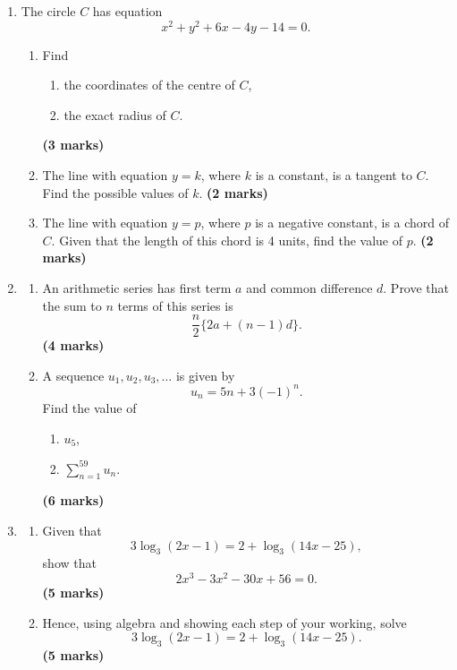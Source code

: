 \documentclass{../Templates/sbs-exam}
\newcommand{\imarks}[1]{\hfill \textbf{(#1 marks)}}
\begin{document}
\begin{enumerate}
\newpage

\item %
The circle $C$ has equation
\[
x^{2}+y^{2}+6x-4y-14=0.
\]
\begin{enumerate}
    \item[(a)] Find
    \begin{enumerate}
        \item[(i)] the coordinates of the centre of $C$,
        \item[(ii)] the exact radius of $C$.
    \end{enumerate} \imarks{3}
    \item[(b)] The line with equation $y=k$, where $k$ is a constant, is a tangent to $C$. Find the possible values of $k$. \imarks{2}
    \item[(c)] The line with equation $y=p$, where $p$ is a negative constant, is a chord of $C$. Given that the length of this chord is 4 units, find the value of $p$. \imarks{2}
\end{enumerate}

\newpage

\item %
\begin{enumerate}
    \item[(i)] An arithmetic series has first term $a$ and common difference $d$. Prove that the sum to $n$ terms of this series is
    \[
    \frac{n}{2}\{2a+(n-1)d\}.
    \] \imarks{4}
    \item[(ii)] A sequence $u_1, u_2, u_3, \dots$ is given by
    \[
    u_n = 5n + 3(-1)^n.
    \]
    Find the value of
    \begin{enumerate}
        \item[(a)] $u_5$,
        \item[(b)] $\sum_{n=1}^{59} u_n$.
    \end{enumerate} \imarks{6}
\end{enumerate}

\newpage

\item %
\begin{enumerate}
    \item[(a)] Given that
    \[
    3\log_3(2x-1) = 2 + \log_3(14x-25),
    \]
    show that
    \[
    2x^3 - 3x^2 - 30x + 56 = 0.
    \] \imarks{5}
    \item[(b)] Hence, using algebra and showing each step of your working, solve
    \[
    3\log_3(2x-1) = 2 + \log_3(14x-25).
    \] \imarks{5}
\end{enumerate}


\end{enumerate}
\end{document}
